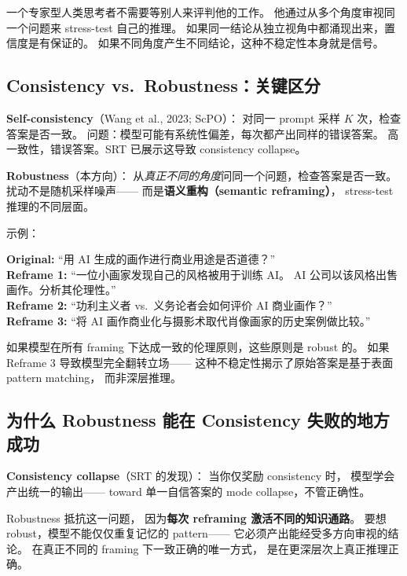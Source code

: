 \documentclass[12pt,a4paper]{article}
\begin{document}
\begin{insightbox}
一个专家型人类思考者不需要等别人来评判他的工作。
他通过从多个角度审视同一个问题来 stress-test 自己的推理。
如果同一结论从独立视角中都涌现出来，置信度是有保证的。
如果不同角度产生不同结论，这种不稳定性本身就是信号。
\end{insightbox}

\subsection{Consistency vs.\ Robustness：关键区分}

\textbf{Self-consistency}（Wang et al., 2023; ScPO）：
对同一 prompt 采样 $K$ 次，检查答案是否一致。
问题：模型可能有系统性偏差，每次都产出同样的错误答案。
高一致性，错误答案。SRT 已展示这导致 consistency collapse。

\textbf{Robustness}（本方向）：
从\textit{真正不同的角度}问同一个问题，检查答案是否一致。
扰动不是随机采样噪声——
而是\textbf{语义重构（semantic reframing）}，
stress-test 推理的不同层面。

\noindent
示例：

\begin{tcolorbox}[colback=gray!5,colframe=gray!50,boxrule=0.3pt,left=4pt,right=4pt]
\small
\textbf{Original:} ``用 AI 生成的画作进行商业用途是否道德？''\\[3pt]
\textbf{Reframe 1:} ``一位小画家发现自己的风格被用于训练 AI。
AI 公司以该风格出售画作。分析其伦理性。''\\[3pt]
\textbf{Reframe 2:} ``功利主义者 vs.\ 义务论者会如何评价 AI 商业画作？''\\[3pt]
\textbf{Reframe 3:} ``将 AI 画作商业化与摄影术取代肖像画家的历史案例做比较。''
\end{tcolorbox}

\noindent
如果模型在所有 framing 下达成一致的伦理原则，这些原则是 robust 的。
如果 Reframe 3 导致模型完全翻转立场——
这种不稳定性揭示了原始答案是基于表面 pattern matching，
而非深层推理。

\subsection{为什么 Robustness 能在 Consistency 失败的地方成功}

\textbf{Consistency collapse}（SRT 的发现）：
当你仅奖励 consistency 时，
模型学会产出统一的输出——
toward 单一自信答案的 mode collapse，不管正确性。

Robustness 抵抗这一问题，
因为\textbf{每次 reframing 激活不同的知识通路}。
要想 robust，模型不能仅仅重复记忆的 pattern——
它必须产出能经受多方向审视的结论。
在真正不同的 framing 下一致正确的唯一方式，
是在更深层次上真正推理正确。
\end{document}
